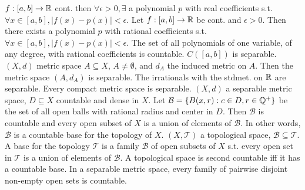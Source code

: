 $f: [a,b] \to \mathbb{R}$ cont. then $\forall \epsilon > 0, \exists$ a polynomial $p$ with real coefficients s.t.
$\forall x \in [a,b], |f(x) - p(x)| < \epsilon$.
 Let $f: [a,b] \to \mathbb{R}$ be cont. and $\epsilon > 0$.
Then there exists a polynomial $p$ with rational coefficients s.t.
$\forall x \in [a,b], |f(x) - p(x)| < \epsilon$.
 The set of all polynomials of one variable, of any degree, with rational coefficients is countable.
 $C([a,b])$ is separable.
 $(X, d)$ metric space $A \subseteq X$, $A \neq \emptyset$, and $d_A$ the induced metric on $A$.
Then the metric space $(A, d_A)$ is separable.
 The irrationals with the stdmet. on $\mathbb{R}$ are separable.
\wt{} Every compact metric space is separable.
 $(X,d)$ a separable metric space, $D \subseteq X$ countable and dense in $X$.
Let $\mathcal{B} = \{B(x,r) : c \in D, r \in \mathbb{Q}^+\}$ be the set of all open balls with rational radius and
center in $D$.
Then $\mathcal{B}$ is countable and every open subset of $X$ is a union of elements of $\mathcal{B}$.
In other words, $\mathcal{B}$ is a countable base for the topology of $X$.
 $(X, \mathcal{T})$ a topological space, $\mathcal{B} \subseteq \mathcal{T}$.
A base for the topology $\mathcal{T}$ is a family $\mathcal{B}$ of open subsets of $X$ s.t.
every open set in $\mathcal{T}$ is a union of elements of $\mathcal{B}$.
 A topological space is second countable iff it has a countable base.
 In a separable metric space, every family of pairwise disjoint non-empty open sets is countable.
